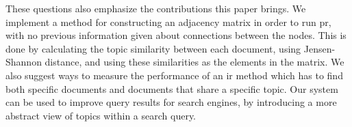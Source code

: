 These questions also emphasize the contributions this paper brings.
We implement a method for constructing an adjacency matrix in order to run \gls{pr}, with no previous information given about connections between the nodes.
This is done by calculating the topic similarity between each document, using Jensen-Shannon distance, and using these similarities as the elements in the matrix.
We also suggest ways to measure the performance of an \gls{ir} method which has to find both specific documents and documents that share a specific topic.
Our system can be used to improve query results for search engines, by introducing a more abstract view of topics within a search query.